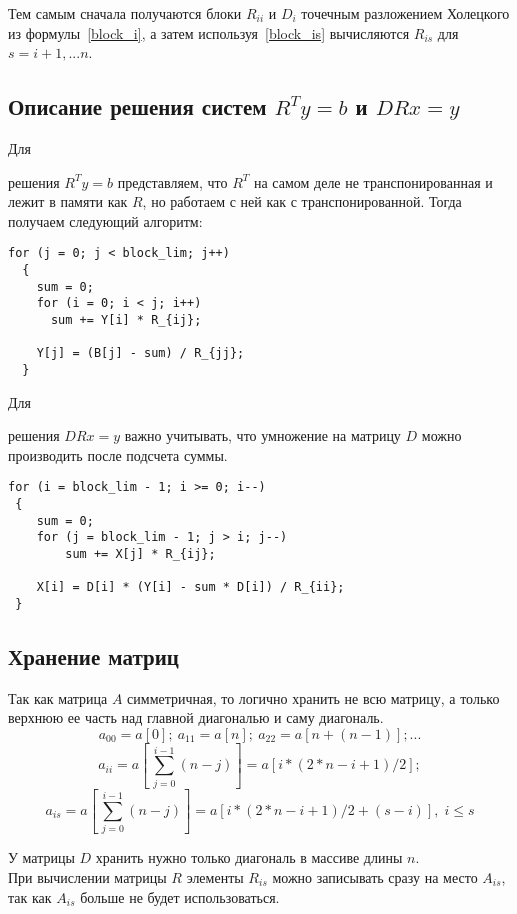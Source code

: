 \documentclass[a4paper,12pt]{article}
\begin{document}
    Тем самым сначала получаются блоки $R_{ii}$ и $D_i$ точечным разложением 
    Холецкого из формулы~\eqref{block_i}, а затем используя~\eqref{block_is} 
    вычисляются $R_{is}$ для $s = i+1,...n$.


\subsection{Описание решения систем $R^T y = b$ и $DRx = y$}
    \hypertarget{calc_y}{Для} 
    решения $R^T y = b$ представляем, что $R^T$ на самом деле не транспонированная
    и лежит в памяти как $R$, но работаем с ней как с транспонированной. 
    Тогда получаем следующий алгоритм:
    
\begin{verbatim}
for (j = 0; j < block_lim; j++) 
  {
    sum = 0;
    for (i = 0; i < j; i++)
      sum += Y[i] * R_{ij};
    
    Y[j] = (B[j] - sum) / R_{jj};
  }
\end{verbatim}

    \hypertarget{calc_x}{Для} 
    решения $DRx = y$ важно учитывать, что умножение на матрицу $D$ можно производить после подсчета суммы.
    
\begin{verbatim}
for (i = block_lim - 1; i >= 0; i--)
 {
    sum = 0;
    for (j = block_lim - 1; j > i; j--)
        sum += X[j] * R_{ij};
    
    X[i] = D[i] * (Y[i] - sum * D[i]) / R_{ii};
 }
\end{verbatim}


\subsection{Хранение матриц}
    Так как матрица $A$ симметричная, то логично хранить не всю матрицу, 
    а только верхнюю ее часть над главной диагональю и саму диагональ. 
    $$ a_{00} = a [0]; \ a_{11} = a [n]; \ a_{22} = a [n + (n-1)]; ... $$
    $$ a_{ii} = a [\,\sum_{j=0}^{i-1}(n-j)] = a [i * (2 * n - i +1) / 2];  $$
    $$ 
        a_{is} = a [\,\sum_{j=0}^{i-1}(n-j)] = a [i * (2 * n - i +1) / 2 + (s - i)], 
        \; i \leq s  
    $$
    
    У матрицы $D$ хранить нужно только диагональ в массиве длины $n$.\\
    
    При вычислении матрицы $R$ элементы $R_{is}$ можно записывать сразу на место $A_{is}$,
    так как $A_{is}$ больше не будет использоваться. 
    
\end{document}
